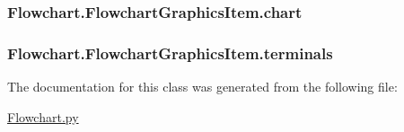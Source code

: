 \subsubsection[{chart}]{\setlength{\rightskip}{0pt plus 5cm}Flowchart.\+Flowchart\+Graphics\+Item.\+chart}\label{classFlowchart_1_1FlowchartGraphicsItem_a45b3c53ca87846d8371be9a2b4f105de}
\hypertarget{classFlowchart_1_1FlowchartGraphicsItem_a919ee98b54e9529135f69abc23d7ebe9}{}
\subsubsection[{terminals}]{\setlength{\rightskip}{0pt plus 5cm}Flowchart.\+Flowchart\+Graphics\+Item.\+terminals}\label{classFlowchart_1_1FlowchartGraphicsItem_a919ee98b54e9529135f69abc23d7ebe9}


The documentation for this class was generated from the following file\+:\begin{DoxyCompactItemize}
\item 
\hyperlink{Flowchart_8py}{Flowchart.\+py}\end{DoxyCompactItemize}
